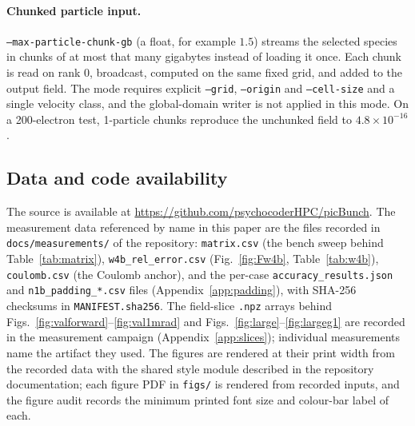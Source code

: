 \paragraph{Chunked particle input.}
\texttt{--max-particle-chunk-gb} (a float, for example $1.5$) streams the
selected species in chunks of at most that many gigabytes instead of loading
it once.  Each chunk is read on rank 0, broadcast, computed on the same fixed
grid, and added to the output field.  The mode requires explicit
\texttt{--grid}, \texttt{--origin} and \texttt{--cell-size} and a single
velocity class, and the global-domain writer is not applied in this mode.
On a 200-electron test, 1-particle chunks reproduce the unchunked field to
$4.8\times10^{-16}$.

\subsection{Data and code availability}
\label{sec:availability}

The source is available at
\url{https://github.com/psychocoderHPC/picBunch}. The measurement data
referenced by name in this paper are the files recorded in
\texttt{docs/measurements/} of the repository: \texttt{matrix.csv} (the
bench sweep behind Table~\ref{tab:matrix}), \texttt{w4b\_rel\_error.csv}
(Fig.~\ref{fig:Fw4b}, Table~\ref{tab:w4b}), \texttt{coulomb.csv} (the
Coulomb anchor), and the
per-case \texttt{accuracy\_results.json} and \texttt{n1b\_padding\_*.csv}
files (Appendix~\ref{app:padding}), with SHA-256 checksums in
\texttt{MANIFEST.sha256}. The field-slice \texttt{.npz} arrays behind
Figs.~\ref{fig:valforward}--\ref{fig:val1mrad} and
Figs.~\ref{fig:large}--\ref{fig:largeg1} are recorded in the measurement
campaign (Appendix~\ref{app:slices}); individual measurements name the
artifact they used. The figures are rendered at their print width from the
recorded data with the shared style module described in the repository
documentation; each figure PDF in \texttt{figs/} is rendered from
recorded inputs, and the figure audit records the minimum printed font size
and colour-bar label of each.
